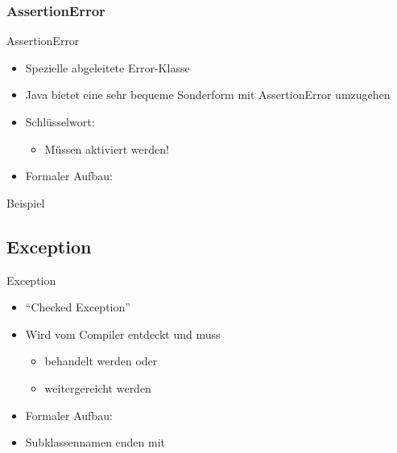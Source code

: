 \documentclass{../tuda-beamer}
\begin{document}
    \subsubsection{AssertionError}
    \label{subsubsec:assertion-error}
    \begin{frame}{AssertionError}
        \begin{itemize}
            \item Spezielle abgeleitete Error-Klasse
            \item Java bietet eine sehr bequeme Sonderform mit AssertionError umzugehen
            \item Schlüsselwort: 
            \begin{itemize}
                \item Müssen aktiviert werden!
            \end{itemize}
            \item Formaler Aufbau:

            
        \end{itemize}
    \end{frame}

    \begin{frame}[c]{Beispiel}
        
    \end{frame}

    \subsection{Exception}
    \label{subsec:exception}
    \begin{frame}[c]{Exception}
        \begin{itemize}
            \item \enquote{Checked Exception}
            \item Wird vom Compiler entdeckt und muss
            \begin{itemize}{}
                \item behandelt werden oder
                \item weitergereicht werden
            \end{itemize}
            \item Formaler Aufbau:
            \begin{center}
            \end{center}
            \item Subklassennamen enden mit 
        \end{itemize}
    \end{frame}
\end{document}

